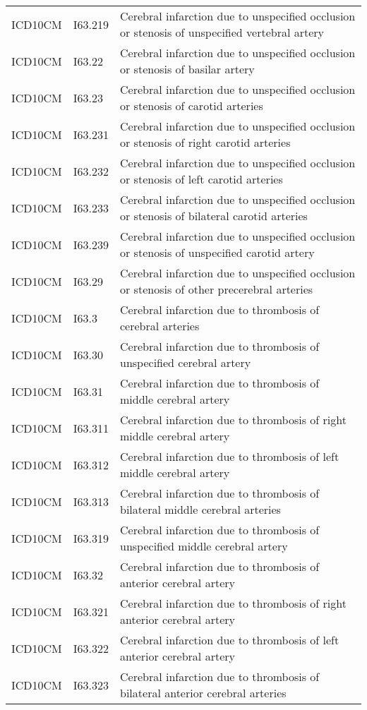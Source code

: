 \begin{longtable}{p{}p{}p{}}
  ICD10CM & I63.219 & Cerebral infarction due to unspecified occlusion or stenosis of unspecified vertebral artery \\ 
  ICD10CM & I63.22 & Cerebral infarction due to unspecified occlusion or stenosis of basilar artery \\ 
  ICD10CM & I63.23 & Cerebral infarction due to unspecified occlusion or stenosis of carotid arteries \\ 
  ICD10CM & I63.231 & Cerebral infarction due to unspecified occlusion or stenosis of right carotid arteries \\ 
  ICD10CM & I63.232 & Cerebral infarction due to unspecified occlusion or stenosis of left carotid arteries \\ 
  ICD10CM & I63.233 & Cerebral infarction due to unspecified occlusion or stenosis of bilateral carotid arteries \\ 
  ICD10CM & I63.239 & Cerebral infarction due to unspecified occlusion or stenosis of unspecified carotid artery \\ 
  ICD10CM & I63.29 & Cerebral infarction due to unspecified occlusion or stenosis of other precerebral arteries \\ 
  ICD10CM & I63.3 & Cerebral infarction due to thrombosis of cerebral arteries \\ 
  ICD10CM & I63.30 & Cerebral infarction due to thrombosis of unspecified cerebral artery \\ 
  ICD10CM & I63.31 & Cerebral infarction due to thrombosis of middle cerebral artery \\ 
  ICD10CM & I63.311 & Cerebral infarction due to thrombosis of right middle cerebral artery \\ 
  ICD10CM & I63.312 & Cerebral infarction due to thrombosis of left middle cerebral artery \\ 
  ICD10CM & I63.313 & Cerebral infarction due to thrombosis of bilateral middle cerebral arteries \\ 
  ICD10CM & I63.319 & Cerebral infarction due to thrombosis of unspecified middle cerebral artery \\ 
  ICD10CM & I63.32 & Cerebral infarction due to thrombosis of anterior cerebral artery \\ 
  ICD10CM & I63.321 & Cerebral infarction due to thrombosis of right anterior cerebral artery \\ 
  ICD10CM & I63.322 & Cerebral infarction due to thrombosis of left anterior cerebral artery \\ 
  ICD10CM & I63.323 & Cerebral infarction due to thrombosis of bilateral anterior cerebral arteries \\ 

\end{longtable}
